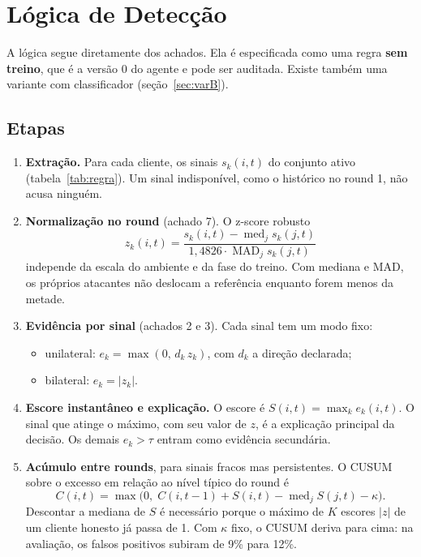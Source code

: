 \documentclass[11pt,a4paper]{article}
\begin{document}
\section{Lógica de Detecção}
\label{sec:logica}

A lógica segue diretamente dos achados. Ela é especificada como uma regra \textbf{sem treino}, que é a
versão 0 do agente e pode ser auditada. Existe também uma variante com classificador (seção~\ref{sec:varB}).

\subsection{Etapas}
\begin{enumerate}
  \item \textbf{Extração.} Para cada cliente, os sinais $s_k(i,t)$ do conjunto ativo
        (tabela~\ref{tab:regra}). Um sinal indisponível, como o histórico no round 1, não acusa ninguém.

  \item \textbf{Normalização no round} (achado 7). O z-score robusto
        \[ z_k(i,t) = \frac{s_k(i,t) - \operatorname{med}_j s_k(j,t)}{1{,}4826 \cdot \operatorname{MAD}_j s_k(j,t)} \]
        independe da escala do ambiente e da fase do treino. Com mediana e MAD, os próprios atacantes
        não deslocam a referência enquanto forem menos da metade.

  \item \textbf{Evidência por sinal} (achados 2 e 3). Cada sinal tem um modo fixo:
        \begin{itemize}
          \item unilateral: $e_k = \max(0,\, d_k\, z_k)$, com $d_k$ a direção declarada;
          \item bilateral: $e_k = |z_k|$.
        \end{itemize}

  \item \textbf{Escore instantâneo e explicação.} O escore é $S(i,t) = \max_k e_k(i,t)$. O sinal que
        atinge o máximo, com seu valor de $z$, é a explicação principal da decisão. Os demais $e_k > \tau$
        entram como evidência secundária.

  \item \textbf{Acúmulo entre rounds}, para sinais fracos mas persistentes. O CUSUM~\cite{cusum} sobre o
        excesso em relação ao nível típico do round é
        \[ C(i,t) = \max\bigl(0,\; C(i,t-1) + S(i,t) - \operatorname{med}_j S(j,t) - \kappa\bigr). \]
        Descontar a mediana de $S$ é necessário porque o máximo de $K$ escores $|z|$ de um cliente honesto
        já passa de 1. Com $\kappa$ fixo, o CUSUM deriva para cima: na avaliação, os falsos positivos
        subiram de 9\% para 12\%.


\end{enumerate}
\end{document}
